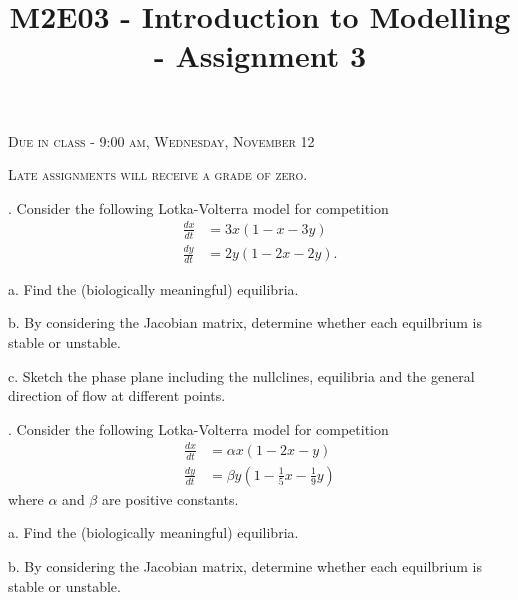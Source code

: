 \documentclass[reqno,12pt]{amsart}
\def\dxdt{\frac{dx}{dt}}
\def\dydt{\frac{dy}{dt}}
\begin{document}
\title{M2E03 - Introduction to Modelling - Assignment 3}
\maketitle

\begin{center}
\pagestyle{myheadings} 
\thispagestyle{empty}

\bigskip

\textsc{Due in class - 9:00 am, Wednesday, November 12}

\bigskip

\textsc{Late assignments will receive a grade of zero.}

%

\bigskip
\bigskip
\end{center}

.  Consider the following Lotka-Volterra model for competition
\begin{equation*}
\begin{aligned}
\dxdt &= 3 x (1 -   x - 3 y)	\\
\dydt &= 2 y (1 - 2 x - 2 y).
\end{aligned}
\end{equation*}

\noindent
a.  Find the (biologically meaningful) equilibria.

\noindent
b.  By considering the Jacobian matrix, determine whether each
equilbrium is stable or unstable.

\noindent
c.  Sketch the phase plane including the nullclines, equilibria
and the general direction of flow at different points.

\vspace{1cm}

.  Consider the following Lotka-Volterra model for competition
\begin{equation*}
\begin{aligned}
\dxdt &= \alpha x (1 - 2 x -   y)			\\
\dydt &= \beta  y (1 - \frac 15 x - \frac 19 y)
\end{aligned}
\end{equation*}
where $\alpha$ and $\beta$ are positive constants.

\noindent
a.  Find the (biologically meaningful) equilibria.

\noindent
b.  By considering the Jacobian matrix, determine whether each
equilbrium is stable or unstable.
\end{document}
